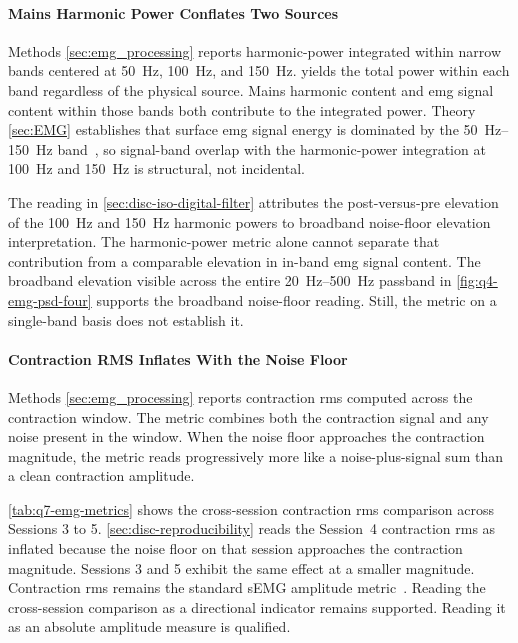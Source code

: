\paragraph{Mains Harmonic Power Conflates Two Sources}
\label{sec:disc-lim-harmonic}

Methods \autoref{sec:emg_processing} reports harmonic-power integrated within narrow bands centered at \SI{50}{\hertz}, \SI{100}{\hertz}, and \SI{150}{\hertz}. yields the total power within each
band regardless of the physical source. Mains harmonic content and \gls{emg} signal content within those bands both contribute to the integrated power. Theory \autoref{sec:EMG} establishes that surface \gls{emg} signal energy is dominated by the \SIrange{50}{150}{\hertz} band~\cite{kamen_essentials_2010}, so signal-band overlap with the harmonic-power integration at \SI{100}{\hertz} and \SI{150}{\hertz} is structural, not incidental.

The reading in \autoref{sec:disc-iso-digital-filter} attributes the post-versus-pre elevation of the \SI{100}{\hertz} and \SI{150}{\hertz} harmonic powers to broadband noise-floor elevation interpretation. The harmonic-power metric alone cannot separate that contribution from a comparable elevation in in-band \gls{emg} signal content. The broadband elevation visible across the entire \SIrange{20}{500}{\hertz} passband in \autoref{fig:q4-emg-psd-four} supports the broadband noise-floor reading. Still, the metric on a single-band basis does not establish it.

\paragraph{Contraction RMS Inflates With the Noise Floor}
\label{sec:disc-lim-rms-inflation}

Methods \autoref{sec:emg_processing} reports contraction \gls{rms} computed across the contraction window. The metric combines both the contraction signal and any noise present in the window. When the noise floor approaches the contraction magnitude, the metric reads progressively more like a noise-plus-signal sum than a clean contraction amplitude.

\autoref{tab:q7-emg-metrics} shows the cross-session contraction \gls{rms} comparison across Sessions 3 to 5. \autoref{sec:disc-reproducibility} reads the Session~4 contraction \gls{rms} as inflated because the noise floor on that session approaches the contraction magnitude. Sessions 3 and 5 exhibit the same effect at a smaller magnitude. Contraction \gls{rms} remains the standard sEMG amplitude metric~\cite{kamen_essentials_2010}. Reading the cross-session comparison as a directional indicator remains supported. Reading it as an absolute amplitude measure is qualified.


